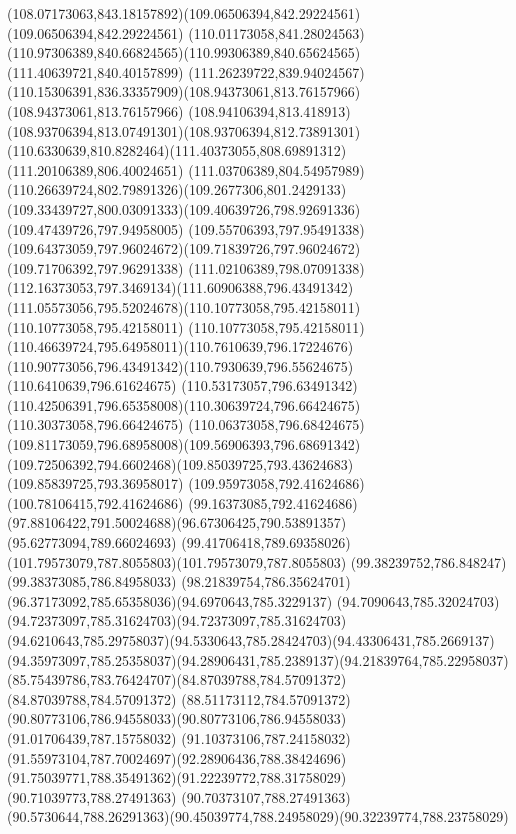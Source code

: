 {{\curveto(108.07173063,843.18157892)(109.06506394,842.29224561)(109.06506394,842.29224561)
\curveto(110.01173058,841.28024563)(110.97306389,840.66824565)(110.99306389,840.65624565)
\lineto(111.40639721,840.40157899)
\lineto(111.26239722,839.94024567)
\curveto(110.15306391,836.33357909)(108.94373061,813.76157966)(108.94373061,813.76157966)
\curveto(108.94106394,813.418913)(108.93706394,813.07491301)(108.93706394,812.73891301)
\curveto(110.6330639,810.8282464)(111.40373055,808.69891312)(111.20106389,806.40024651)
\curveto(111.03706389,804.54957989)(110.26639724,802.79891326)(109.2677306,801.2429133)
\curveto(109.33439727,800.03091333)(109.40639726,798.92691336)(109.47439726,797.94958005)
\curveto(109.55706393,797.95491338)(109.64373059,797.96024672)(109.71839726,797.96024672)
\lineto(109.71706392,797.96291338)
\curveto(111.02106389,798.07091338)(112.16373053,797.3469134)(111.60906388,796.43491342)
\curveto(111.05573056,795.52024678)(110.10773058,795.42158011)(110.10773058,795.42158011)
\curveto(110.10773058,795.42158011)(110.46639724,795.64958011)(110.7610639,796.17224676)
\curveto(110.90773056,796.43491342)(110.7930639,796.55624675)(110.6410639,796.61624675)
\curveto(110.53173057,796.63491342)(110.42506391,796.65358008)(110.30639724,796.66424675)
\lineto(110.30373058,796.66424675)
\curveto(110.06373058,796.68424675)(109.81173059,796.68958008)(109.56906393,796.68691342)
\curveto(109.72506392,794.6602468)(109.85039725,793.43624683)(109.85839725,793.36958017)
\lineto(109.95973058,792.41624686)
\lineto(100.78106415,792.41624686)
\lineto(99.16373085,792.41624686)
\curveto(97.88106422,791.50024688)(96.67306425,790.53891357)(95.62773094,789.66024693)
\curveto(99.41706418,789.69358026)(101.79573079,787.8055803)(101.79573079,787.8055803)
\lineto(99.38239752,786.848247)
\lineto(99.38373085,786.84958033)
\curveto(98.21839754,786.35624701)(96.37173092,785.65358036)(94.6970643,785.3229137)
\curveto(94.7090643,785.32024703)(94.72373097,785.31624703)(94.72373097,785.31624703)
\curveto(94.6210643,785.29758037)(94.5330643,785.28424703)(94.43306431,785.2669137)
\curveto(94.35973097,785.25358037)(94.28906431,785.2389137)(94.21839764,785.22958037)
\curveto(85.75439786,783.76424707)(84.87039788,784.57091372)(84.87039788,784.57091372)
\curveto(88.51173112,784.57091372)(90.80773106,786.94558033)(90.80773106,786.94558033)
\lineto(91.01706439,787.15758032)
\curveto(91.10373106,787.24158032)(91.55973104,787.70024697)(92.28906436,788.38424696)
\curveto(91.75039771,788.35491362)(91.22239772,788.31758029)(90.71039773,788.27491363)
\lineto(90.70373107,788.27491363)
\curveto(90.5730644,788.26291363)(90.45039774,788.24958029)(90.32239774,788.23758029)
}}

